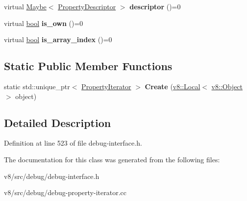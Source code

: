 \begin{DoxyCompactItemize}
virtual \mbox{\hyperlink{classv8_1_1Maybe}{Maybe}}$<$ \mbox{\hyperlink{structv8_1_1debug_1_1PropertyDescriptor}{Property\+Descriptor}} $>$ {\bfseries descriptor} ()=0
\item 
\mbox{\label{classv8_1_1debug_1_1PropertyIterator_afa7b165e8aa3bc6b3f3eb0c72b866749}} 
virtual \mbox{\hyperlink{classbool}{bool}} {\bfseries is\+\_\+own} ()=0
\item 
\mbox{\label{classv8_1_1debug_1_1PropertyIterator_a7150bc99879c4ddb53e0fd4574cf1cc9}} 
virtual \mbox{\hyperlink{classbool}{bool}} {\bfseries is\+\_\+array\+\_\+index} ()=0
\end{DoxyCompactItemize}
\subsection*{Static Public Member Functions}
\begin{DoxyCompactItemize}
\item 
\mbox{\label{classv8_1_1debug_1_1PropertyIterator_af442b86c54d1133c7a387ff78ce8d23b}} 
static std\+::unique\+\_\+ptr$<$ \mbox{\hyperlink{classv8_1_1debug_1_1PropertyIterator}{Property\+Iterator}} $>$ {\bfseries Create} (\mbox{\hyperlink{classv8_1_1Local}{v8\+::\+Local}}$<$ \mbox{\hyperlink{classv8_1_1Object}{v8\+::\+Object}} $>$ object)
\end{DoxyCompactItemize}


\subsection{Detailed Description}


Definition at line 523 of file debug-\/interface.\+h.



The documentation for this class was generated from the following files\+:\begin{DoxyCompactItemize}
\item 
v8/src/debug/debug-\/interface.\+h\item 
v8/src/debug/debug-\/property-\/iterator.\+cc\end{DoxyCompactItemize}
